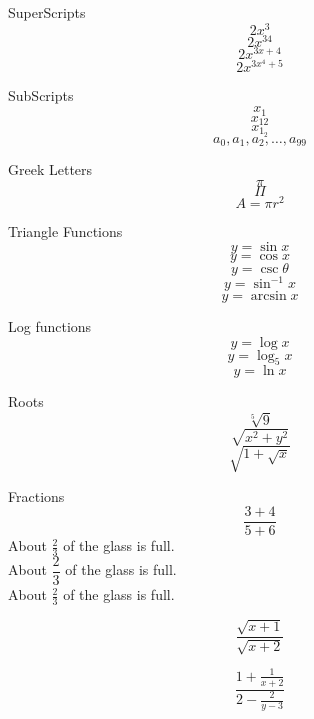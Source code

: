 \documentclass[12pt]{article}
\begin{document}
SuperScripts $$2x^3$$
$$2x^{34}$$
$$2x^{3x+4}$$
$$2x^{3x^4+5}$$

SubScripts
$$x_1$$
$$x_{12}$$
$$x_{1_2}$$
$$a_0, a_1,a_2, \ldots, a_{99}$$

Greek Letters
$$\pi$$
$$\Pi$$
$$A=\pi r^2$$

Triangle Functions
$$y=\sin x$$
$$y=\cos x$$
$$y=\csc \theta$$
$$y=\sin^{-1}x$$
$$y=\arcsin x$$

Log functions
$$y=\log x$$
$$y=\log_5 x$$
$$y=\ln x$$

Roots
$$\sqrt[5]{9}$$
$$\sqrt{x^2+y^2}$$
$$\sqrt{1+\sqrt{x}}$$

Fractions
$$\frac{3+4}{5+6}$$
About $\displaystyle\frac{2}{3}$ of the glass is full.\\[16pt]
About $\dfrac{2}{3}$ of the glass is full.\\[16pt]
About $\frac{2}{3}$ of the glass is full.

$$\frac{\sqrt{x+1}}{\sqrt{x+2}}$$

$$\frac{1+\frac{1}{x+2}}{2-\frac{2}{y-3}}$$
\end{document}
